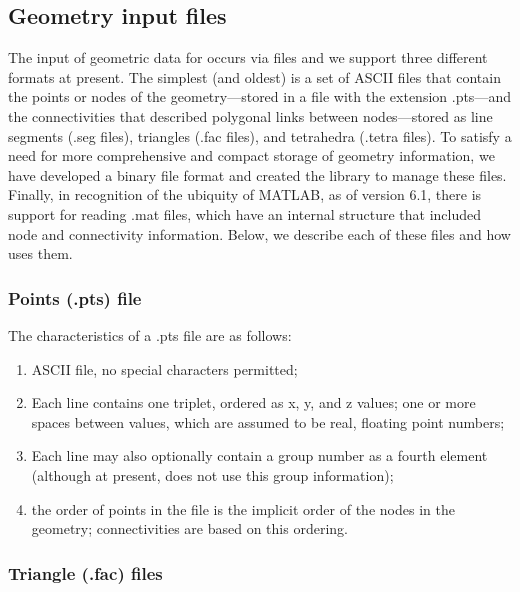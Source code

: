 
\subsection{Geometry input files}
\label{sec:geomfiles} 

The input of geometric data for \map{} occurs via files and we support
three different formats at present.  The simplest (and oldest) is a set of
ASCII files that contain the points or nodes of the geometry---stored in a
file with the extension .pts---and the connectivities that described
polygonal links between nodes---stored as line segments (.seg files),
triangles (.fac files), and tetrahedra (.tetra files).  To satisfy a need
for more comprehensive and compact storage of geometry information, we have
developed a binary file format and created the \graphicsio{} library to
manage these files.  Finally, in recognition of the ubiquity of MATLAB, as
of version 6.1, there is support for reading .mat files, which have an
internal structure that included node and connectivity information.  Below,
we describe each of these files and how \map{} uses them.

\subsubsection{Points (.pts) file}

The characteristics of a .pts file are as follows:
%
\begin{enumerate}
  \item ASCII file, no special characters permitted;
  \item Each line contains one triplet, ordered as x, y, and z values; one
        or more spaces between values, which are assumed to be real, 
        floating point numbers; 
  \item Each line may also optionally contain a group number as a fourth 
        element (although at present, \map{} does not use this group
        information); 
  \item the order of points in the file is the implicit order of the nodes in
        the geometry; connectivities are based on this ordering.
\end{enumerate}


\subsubsection{Triangle (.fac) files}

